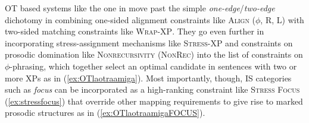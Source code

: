 \ac{OT} based systems like the one in \citet{Truckenbrodt.1995} move past the 
simple \textit{one-edge}/\textit{two-edge} dichotomy in combining one-sided 
alignment constraints like \textsc{Align ($\phi$, R, L)} with two-sided matching constraints like 
\textsc{Wrap-XP}. They go even further in incorporating 
stress-assign\-ment mechanisms like \textsc{Stress-XP} 
and constraints on prosodic domination like \textsc{Nonrecursivity 
(NonRec)} into the list of constraints on 
$\phi$-phrasing, which together select an optimal candidate in sentences 
with two or more \acp{XP} as in (\ref{ex:OTlaotraamiga}). Most 
importantly, though, \ac{IS} categories such as \textit{focus} can be 
incorporated as a high-ranking constraint like \textsc{Stress Focus} 
(\ref{ex:stressfocus}) \citep[235]{Gabriel2007} that override other 
mapping requirements to give rise to marked prosodic structures as in 
(\ref{ex:OTlaotraamigaFOCUS}).
%
%
